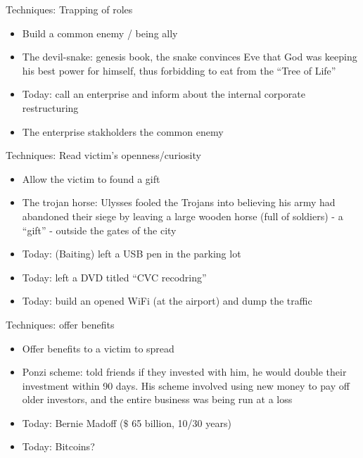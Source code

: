\documentclass{beamer}
\begin{document}
\begin{frame}{Techniques: Trapping of roles}
  \begin{itemize}
    \item Build a common enemy / being ally
    \item The devil-snake: genesis book, the snake convinces Eve that God was
      keeping his best power for himself, thus forbidding to eat from
      the ``Tree of Life''
    \item<2-> Today: call an enterprise and inform about the internal
      corporate restructuring
    \item<2-> The enterprise stakholders the common enemy 
  \end{itemize}
\end{frame}

\begin{frame}{Techniques: Read victim's openness/curiosity}
  \begin{itemize}
    \item Allow the victim to found a gift
    \item The trojan horse: Ulysses fooled the Trojans into believing
       his army had abandoned their siege by leaving a large
      wooden horse (full of soldiers) - a ``gift'' - outside the gates of the city
    \item<2-> Today: (Baiting) left a USB pen in the parking lot
    \item<2-> Today: left a DVD titled ``CVC recodring''
    \item<2-> Today: build an opened WiFi (at the airport) and dump the traffic
  \end{itemize}
\end{frame}

\begin{frame}{Techniques: offer benefits}
  \begin{itemize}
    \item Offer benefits to a victim to spread
    \item Ponzi scheme:  told friends if they invested with him, he
      would double their investment within 90 days. His scheme
      involved using new money to pay off older investors, and the
      entire business was being run at a loss
    \item Today: Bernie Madoff ($\$$ 65 billion, 10/30 years)
    \item<2-> Today: Bitcoins?
  \end{itemize}
\end{frame}
\end{document}
